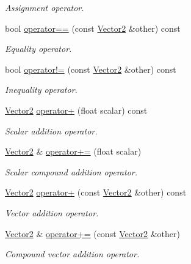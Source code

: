 \begin{DoxyCompactItemize}
\begin{DoxyCompactList}\small\item\em Assignment operator. \end{DoxyCompactList}\item 
bool \hyperlink{classchaos_1_1gfx_1_1_vector2_aee957f369c27fd28b8f387e13c4fb085}{operator==} (const \hyperlink{classchaos_1_1gfx_1_1_vector2}{Vector2} \&other) const 
\begin{DoxyCompactList}\small\item\em Equality operator. \end{DoxyCompactList}\item 
bool \hyperlink{classchaos_1_1gfx_1_1_vector2_ab90c48bca7d89e8594b3eef0571c7824}{operator!=} (const \hyperlink{classchaos_1_1gfx_1_1_vector2}{Vector2} \&other) const 
\begin{DoxyCompactList}\small\item\em Inequality operator. \end{DoxyCompactList}\item 
\hyperlink{classchaos_1_1gfx_1_1_vector2}{Vector2} \hyperlink{classchaos_1_1gfx_1_1_vector2_a4e28157ab025cdc32da4017758bef4ff}{operator+} (float scalar) const 
\begin{DoxyCompactList}\small\item\em Scalar addition operator. \end{DoxyCompactList}\item 
\hyperlink{classchaos_1_1gfx_1_1_vector2}{Vector2} \& \hyperlink{classchaos_1_1gfx_1_1_vector2_a4028e1202905536b973b311e678d1c52}{operator+=} (float scalar)
\begin{DoxyCompactList}\small\item\em Scalar compound addition operator. \end{DoxyCompactList}\item 
\hyperlink{classchaos_1_1gfx_1_1_vector2}{Vector2} \hyperlink{classchaos_1_1gfx_1_1_vector2_a52eb8f6053de6ae27773d42763ab2107}{operator+} (const \hyperlink{classchaos_1_1gfx_1_1_vector2}{Vector2} \&other) const 
\begin{DoxyCompactList}\small\item\em Vector addition operator. \end{DoxyCompactList}\item 
\hyperlink{classchaos_1_1gfx_1_1_vector2}{Vector2} \& \hyperlink{classchaos_1_1gfx_1_1_vector2_abf94321f81a0598b1ee8a8119e1e7ae3}{operator+=} (const \hyperlink{classchaos_1_1gfx_1_1_vector2}{Vector2} \&other)
\begin{DoxyCompactList}\small\item\em Compound vector addition operator. \end{DoxyCompactList}\item 

\end{DoxyCompactItemize}
